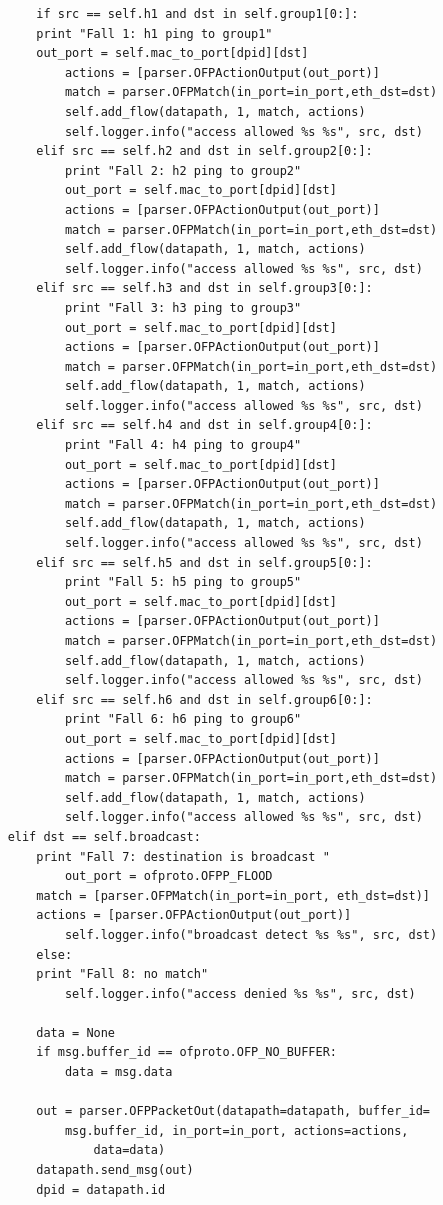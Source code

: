\documentclass[a4,12pt]{scrartcl}
\begin{document}
\begin{lstlisting}
        if src == self.h1 and dst in self.group1[0:]:   
	    print "Fall 1: h1 ping to group1"
	    out_port = self.mac_to_port[dpid][dst]
            actions = [parser.OFPActionOutput(out_port)]
            match = parser.OFPMatch(in_port=in_port,eth_dst=dst)
            self.add_flow(datapath, 1, match, actions)
            self.logger.info("access allowed %s %s", src, dst)
        elif src == self.h2 and dst in self.group2[0:]:
            print "Fall 2: h2 ping to group2"
            out_port = self.mac_to_port[dpid][dst]
            actions = [parser.OFPActionOutput(out_port)]
            match = parser.OFPMatch(in_port=in_port,eth_dst=dst)
            self.add_flow(datapath, 1, match, actions)
            self.logger.info("access allowed %s %s", src, dst)
        elif src == self.h3 and dst in self.group3[0:]:
            print "Fall 3: h3 ping to group3"
            out_port = self.mac_to_port[dpid][dst]
            actions = [parser.OFPActionOutput(out_port)]
            match = parser.OFPMatch(in_port=in_port,eth_dst=dst)
            self.add_flow(datapath, 1, match, actions)
            self.logger.info("access allowed %s %s", src, dst)
        elif src == self.h4 and dst in self.group4[0:]:
            print "Fall 4: h4 ping to group4"
            out_port = self.mac_to_port[dpid][dst]
            actions = [parser.OFPActionOutput(out_port)]
            match = parser.OFPMatch(in_port=in_port,eth_dst=dst)
            self.add_flow(datapath, 1, match, actions)
            self.logger.info("access allowed %s %s", src, dst)
        elif src == self.h5 and dst in self.group5[0:]:
            print "Fall 5: h5 ping to group5"
            out_port = self.mac_to_port[dpid][dst]
            actions = [parser.OFPActionOutput(out_port)]
            match = parser.OFPMatch(in_port=in_port,eth_dst=dst)
            self.add_flow(datapath, 1, match, actions)
            self.logger.info("access allowed %s %s", src, dst)
        elif src == self.h6 and dst in self.group6[0:]:
            print "Fall 6: h6 ping to group6"
            out_port = self.mac_to_port[dpid][dst]
            actions = [parser.OFPActionOutput(out_port)]
            match = parser.OFPMatch(in_port=in_port,eth_dst=dst)
            self.add_flow(datapath, 1, match, actions)
            self.logger.info("access allowed %s %s", src, dst)        
	elif dst == self.broadcast:
	    print "Fall 7: destination is broadcast " 
            out_port = ofproto.OFPP_FLOOD
	    match = [parser.OFPMatch(in_port=in_port, eth_dst=dst)]
	    actions = [parser.OFPActionOutput(out_port)]
            self.logger.info("broadcast detect %s %s", src, dst)
        else:
	    print "Fall 8: no match" 
            self.logger.info("access denied %s %s", src, dst)

        data = None
        if msg.buffer_id == ofproto.OFP_NO_BUFFER:
            data = msg.data

        out = parser.OFPPacketOut(datapath=datapath, buffer_id=
        	msg.buffer_id, in_port=in_port, actions=actions, 
        		data=data)
        datapath.send_msg(out)
        dpid = datapath.id

\end{lstlisting}
\end{document}
